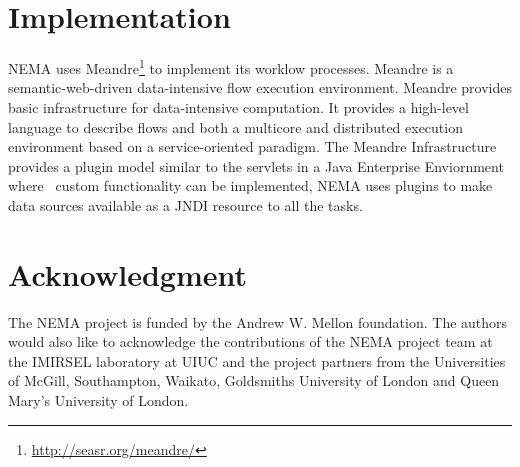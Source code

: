\documentclass[conference]{IEEEtran}
\begin{document}
\section{Implementation}
NEMA uses Meandre\footnote{\url{http://seasr.org/meandre/}} to implement its worklow processes. Meandre is a semantic-web-driven data-intensive flow execution environment. Meandre provides basic infrastructure for data-intensive computation. It provides a high-level language to describe flows and both a multicore and distributed execution environment based on a service-oriented paradigm. The Meandre Infrastructure provides a plugin model similar to the servlets in a Java Enterprise Enviornment where  custom functionality can be implemented, NEMA uses plugins to make data sources available as a JNDI \cite{lee2000jndi} resource to all the tasks.
%
%
%

\section*{Acknowledgment}
The NEMA project is funded by the Andrew W. Mellon foundation. The authors would also like to acknowledge the contributions of the NEMA project team at the IMIRSEL laboratory at UIUC and the project partners from the Universities of McGill, Southampton, Waikato, Goldsmiths University of London and Queen Mary's University of London.
\end{document}
